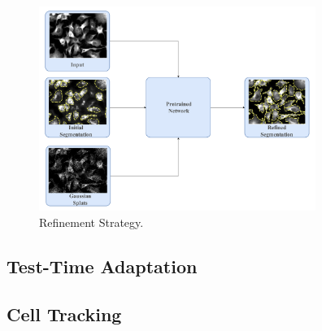 \begin{figure}[t]
    \centering
    \includegraphics[width=9cm]{figs/refinement.pdf}
    \caption{Refinement Strategy.}
    \label{fig:refinement}
\end{figure}

\subsection{Test-Time Adaptation}

\subsection{Cell Tracking}